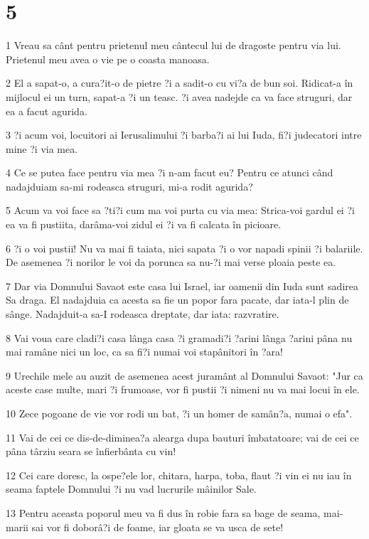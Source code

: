 \chapter{5}

\par 1 Vreau sa cânt pentru prietenul meu cântecul lui de dragoste pentru via lui. Prietenul meu avea o vie pe o coasta manoasa.
\par 2 El a sapat-o, a cura?it-o de pietre ?i a sadit-o cu vi?a de bun soi. Ridicat-a în mijlocul ei un turn, sapat-a ?i un teasc. ?i avea nadejde ca va face struguri, dar ea a facut agurida.
\par 3 ?i acum voi, locuitori ai Ierusalimului ?i barba?i ai lui Iuda, fi?i judecatori intre mine ?i via mea.
\par 4 Ce se putea face pentru via mea ?i n-am facut eu? Pentru ce atunci când nadajduiam sa-mi rodeasca struguri, mi-a rodit agurida?
\par 5 Acum va voi face sa ?ti?i cum ma voi purta cu via mea: Strica-voi gardul ei ?i ea va fi pustiita, darâma-voi zidul ei ?i va fi calcata în picioare.
\par 6 ?i o voi pustii! Nu va mai fi taiata, nici sapata ?i o vor napadi spinii ?i balariile. De asemenea ?i norilor le voi da porunca sa nu-?i mai verse ploaia peste ea.
\par 7 Dar via Domnului Savaot este casa lui Israel, iar oamenii din Iuda sunt sadirea Sa draga. El nadajduia ca acesta sa fie un popor fara pacate, dar iata-l plin de sânge. Nadajduit-a sa-I rodeasca dreptate, dar iata: razvratire.
\par 8 Vai voua care cladi?i casa lânga casa ?i gramadi?i ?arini lânga ?arini pâna nu mai ramâne nici un loc, ca sa fi?i numai voi stapânitori în ?ara!
\par 9 Urechile mele au auzit de asemenea acest juramânt al Domnului Savaot: "Jur ca aceste case multe, mari ?i frumoase, vor fi pustii ?i nimeni nu va mai locui în ele.
\par 10 Zece pogoane de vie vor rodi un bat, ?i un homer de samân?a, numai o efa".
\par 11 Vai de cei ce dis-de-diminea?a alearga dupa bauturi îmbatatoare; vai de cei ce pâna târziu seara se înfierbânta cu vin!
\par 12 Cei care doresc, la ospe?ele lor, chitara, harpa, toba, flaut ?i vin ei nu iau în seama faptele Domnului ?i nu vad lucrurile mâinilor Sale.
\par 13 Pentru aceasta poporul meu va fi dus în robie fara sa bage de seama, mai-marii sai vor fi doborâ?i de foame, iar gloata se va usca de sete!
